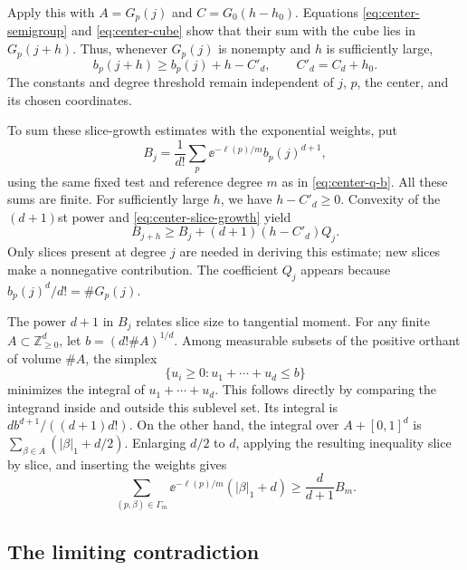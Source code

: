 Apply this with $A=G_p(j)$ and $C=G_0(h-h_0)$. Equations \eqref{eq:center-semigroup} and \eqref{eq:center-cube} show that their sum with the cube lies in $G_p(j+h)$. Thus, whenever $G_p(j)$ is nonempty and $h$ is sufficiently large,
\begin{equation}\label{eq:center-slice-growth}
 b_p(j+h)\ge b_p(j)+h-C'_d,
 \qquad C'_d=C_d+h_0.
\end{equation}
The constants and degree threshold remain independent of $j$, $p$, the center, and its chosen coordinates.

To sum these slice-growth estimates with the exponential weights, put
\[
 B_j=\frac1{d!}\sum_p \ee^{-\ell(p)/m}b_p(j)^{d+1},
\]
using the same fixed test and reference degree $m$ as in \eqref{eq:center-q-b}. All these sums are finite. For sufficiently large $h$, we have $h-C'_d\ge0$. Convexity of the $(d+1)$st power and \eqref{eq:center-slice-growth} yield
\begin{equation}\label{eq:center-b-growth}
 B_{j+h}\ge B_j+(d+1)(h-C'_d)Q_j.
\end{equation}
Only slices present at degree $j$ are needed in deriving this estimate; new slices make a nonnegative contribution. The coefficient $Q_j$ appears because $b_p(j)^d/d!=\#G_p(j)$.

The power $d+1$ in $B_j$ relates slice size to tangential moment. For any finite $A\subset\mathbb{Z}_{\ge0}^d$, let $b=(d!\#A)^{1/d}$. Among measurable subsets of the positive orthant of volume $\#A$, the simplex
\[
 \{u_i\ge0: u_1+\cdots+u_d\le b\}
\]
minimizes the integral of $u_1+\cdots+u_d$. This follows directly by comparing the integrand inside and outside this sublevel set. Its integral is $d b^{d+1}/((d+1)d!)$. On the other hand, the integral over $A+[0,1]^d$ is $\sum_{\beta\in A}(|\beta|_1+d/2)$. Enlarging $d/2$ to $d$, applying the resulting inequality slice by slice, and inserting the weights gives
\begin{equation}\label{eq:center-moment}
 \sum_{(p,\beta)\in\Gamma_m}
 \ee^{-\ell(p)/m}(|\beta|_1+d)
 \ge \frac{d}{d+1}B_m.
\end{equation}

\subsection{The limiting contradiction}

